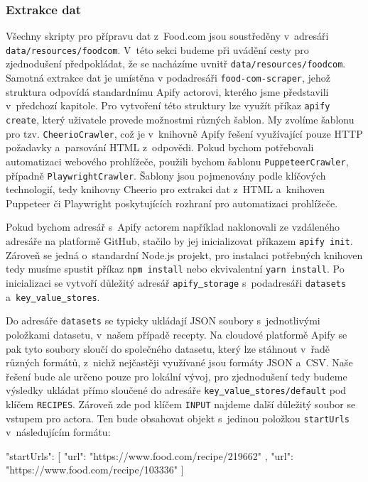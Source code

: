 \subsubsection{Extrakce dat}

Všechny skripty pro přípravu dat z~Food.com jsou soustředěny v~adresáři \texttt{data/resources/foodcom}. V~této sekci budeme při uvádění cesty pro zjednodušení předpokládat, že se nacházíme uvnitř \texttt{data/resources/foodcom}. Samotná extrakce dat je umístěna v podadresáři \texttt{food-com-scraper}, jehož struktura odpovídá standardnímu Apify actorovi, kterého jsme představili v~předchozí kapitole. Pro vytvoření této struktury lze využít příkaz \texttt{apify\,create}, který uživatele provede možnostmi různých šablon. My zvolíme šablonu pro tzv. \texttt{CheerioCrawler}, což je v~knihovně Apify řešení využívající pouze HTTP požadavky a~parsování HTML z~odpovědi. Pokud bychom potřebovali automatizaci webového prohlížeče, použili bychom šablonu \texttt{PuppeteerCrawler}, případně \texttt{PlaywrightCrawler}. Šablony jsou pojmenovány podle klíčových technologií, tedy knihovny Cheerio pro extrakci dat z~HTML a~knihoven Puppeteer či Playwright poskytujících rozhraní pro automatizaci prohlížeče.

Pokud bychom adresář s~Apify actorem například naklonovali ze vzdáleného adresáře na platformě GitHub, stačilo by jej inicializovat příkazem \texttt{apify\,init}. Zároveň se jedná o~standardní Node.js projekt, pro instalaci potřebných knihoven tedy musíme spustit příkaz \texttt{npm\,install} nebo ekvivalentní \texttt{yarn\,install}. Po inicializaci se vytvoří důležitý adresář \texttt{apify\underline{{ }}storage} s~podadresáři \texttt{datasets} a~\texttt{key\underline{{ }}value\underline{{ }}stores}.

Do adresáře \texttt{datasets} se typicky ukládají JSON soubory s~jednotlivými položkami datasetu, v~našem případě recepty. Na cloudové platformě Apify se pak tyto soubory sloučí do společného datasetu, který lze stáhnout v~řadě různých formátů, z~nichž nejčastěji využívané jsou formáty JSON a~CSV. Naše řešení bude ale určeno pouze pro lokální vývoj, pro zjednodušení tedy budeme výsledky ukládat přímo sloučené do adresáře \texttt{key\underline{{ }}value\underline{{ }}stores/default} pod klíčem \texttt{RECIPES}. Zároveň zde pod klíčem \texttt{INPUT} najdeme další důležitý soubor se vstupem pro actora. Ten bude obsahovat objekt s~jedinou položkou \texttt{startUrls} v~následujícím formátu:

\begin{code}
{
  "startUrls": [
    {
      "url": "https://www.food.com/recipe/219662"
    },
    {
      "url": "https://www.food.com/recipe/103336"
    }
  ]
}
\end{code}

